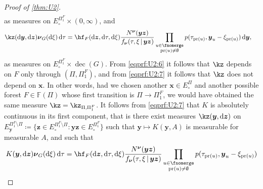 \documentclass[reqno,draft]{amsart}
\numberwithin{equation}{section}
\theoremstyle{plain}
\theoremstyle{remark}
\newcommand*\diff{\mathop{}\!\mathrm{d}}
\DeclareMathOperator{\pr}{pr}
\newcommand{\fpart}{\Pi} %
\DeclareMathOperator{\dcb}{dec}
\newcommand{\fnu}{f_{\boldsymbol \nu}}
\begin{document}
\begin{proof}[Proof of \cref{thm:U2}]
\begin{align}
    \end{align}
    as measures on $E^{\fpart_1^F}_\circ  \times (0,\infty)$, and
    \begin{align}\label{eqprf:U2:7}
        \kz(\diff \boldsymbol y,\diff \boldsymbol z) \boldsymbol \nu_G(\diff \xi) \diff \tau
        &= \hf_F(\diff \boldsymbol z,\diff \tau,\diff \xi)\frac{N^{\boldsymbol \nu}(\boldsymbol y\boldsymbol z)}{\fnu(\tau,\xi \,\vert\,\boldsymbol y\boldsymbol z)} \prod_{\substack{u\in \fnomerge \\ \pr(u) \neq \emptyset } } p(\tau_{\pr(u)},\boldsymbol y_u-\xi_{\pr(u)}) \diff \boldsymbol y,
    \end{align}
    as measures on $E^{\fpart_1^F}_\circ \times \dcb(G)$. From \cref{eqprf:U2:6} it follows that $\kz$ depends on $F$ only through $(\fpart,\fpart_1^F)$, and from \cref{eqprf:U2:7} it follows that $\kz$ does not depend on $\boldsymbol x$. In other words, had we chosen another $\boldsymbol x\in E^\fpart_\circ $ and another possible forest $F \in \mathbb{F}(\fpart)$ whose first transition is $\fpart\to \fpart_1^F$, we would have obtained the same measure $\kz = \kz_{\fpart,\fpart_1^F}$. %
    It follows from \cref{eqprf:U2:7} that $K$ is absolutely continuous in its first component, that is there exist measures $\kz(\boldsymbol y,\diff \boldsymbol z)$ on $E^{\fpart_1^F\setminus \fpart}_{\boldsymbol y}\coloneqq \{\boldsymbol z\in E^{\fpart_1^F\setminus \fpart}_\circ\colon \boldsymbol y\boldsymbol z\in E^{\fpart_1^F}_\circ\} $ such that $\boldsymbol y \mapsto K(\boldsymbol y,A)$ is measurable for measurable $A$, and such that
    \begin{equation}\label{eqprf:U2:8}
        K(\boldsymbol y,\diff \boldsymbol z) \boldsymbol \nu_G(\diff \xi)\diff \tau = \hf_F(\diff \boldsymbol z,\diff \tau,\diff \xi)\frac{N^{\boldsymbol \nu}(\boldsymbol y\boldsymbol z)}{\fnu(\tau,\xi \,\vert\,\boldsymbol y\boldsymbol z)} \prod_{\substack{u\in \fnomerge \\ \pr(u) \neq \emptyset } } p(\tau_{\pr(u)}, \boldsymbol y_u - \xi_{\pr(u)})

\end{equation}
\end{proof}
\end{document}
